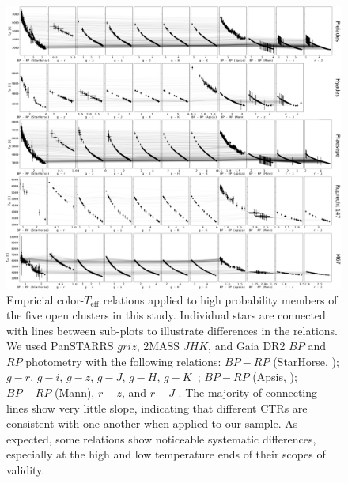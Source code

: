 \documentclass{aa}
\begin{document}
   \begin{figure}
		\centering
           \includegraphics[angle=90, width=\hsize]{pics/clusters/Teff_spread_all.png}

      \caption{Empricial color-$T_\mathrm{eff}$ relations applied to high probability members of the five open clusters in this study. Individual stars are connected with lines between sub-plots to illustrate differences in the relations. We used PanSTARRS $griz$, 2MASS $JHK$, and Gaia DR2 $BP$ and $RP$ photometry with the following relations: $BP-RP$ (StarHorse, \citealt{anders_starhorse_2019}); $g-r$, $g-i$, $g-z$, $g-J$, $g-H$, $g-K$~\citep{boyajian_stellar_2013}; $BP-RP$ (Apsis, \citealt{andrae_gaiaapsis_2018}); $BP-RP$ (Mann), $r-z$, and $r-J$ \citep{mann_erratum_2016}. The majority of connecting lines show very little slope, indicating that different CTRs are consistent with one another when applied to our sample. As expected, some relations show noticeable systematic differences, especially at the high and low temperature ends of their scopes of validity.}
         \label{fig:teff_spread}
   \end{figure}
\end{document}
